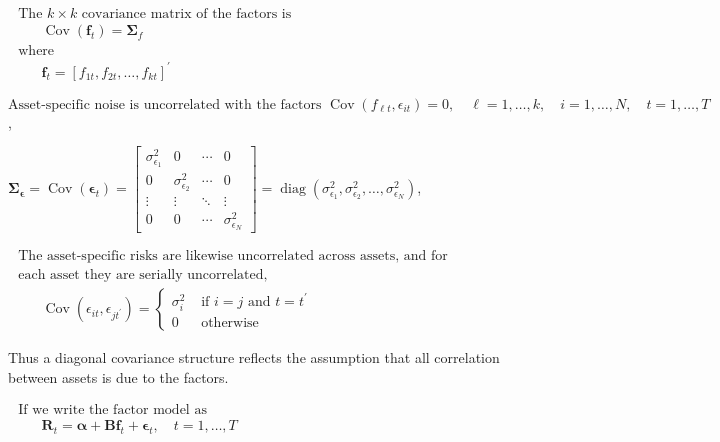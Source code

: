 \documentclass[11pt]{article}
\begin{document}
\(\begin{array}{l}{\text { The } k \times k \text { covariance matrix of the factors is }} \\ {\qquad \operatorname{Cov}\left(\boldsymbol{f}_{t}\right)=\boldsymbol{\Sigma}_{f}} \\ {\text { where }} \\ {\qquad \boldsymbol{f}_{t}=\left[f_{1 t}, f_{2 t}, \ldots, f_{k t}\right]^{\prime}}\end{array}\)

\(\text {Asset-specific noise is uncorrelated with the factors } \operatorname{Cov}\left(f_{\ell t}, \epsilon_{i t}\right)=0, \quad \ell=1, \ldots, k, \quad i=1, \ldots, N, \quad t=1, \ldots, T\),

\(\boldsymbol{\Sigma}_{\boldsymbol{\epsilon}}=\operatorname{Cov}\left(\boldsymbol{\epsilon}_{t}\right)=\left[\begin{array}{cccc}{\sigma_{\epsilon_{1}}^{2}} & {0} & {\cdots} & {0} \\ {0} & {\sigma_{\epsilon_{2}}^{2}} & {\cdots} & {0} \\ {\vdots} & {\vdots} & {\ddots} & {\vdots} \\ {0} & {0} & {\cdots} & {\sigma_{\epsilon_{N}}^{2}}\end{array}\right]=\operatorname{diag}\left(\sigma_{\epsilon_{1}}^{2}, \sigma_{\epsilon_{2}}^{2}, \ldots, \sigma_{\epsilon_{N}}^{2}\right)\),

\(\begin{array}{l}{\text { The asset-specific risks are likewise uncorrelated across assets, and for }} \\ {\text { each asset they are serially uncorrelated, }} \\ {\qquad \operatorname{Cov}\left(\epsilon_{i t}, \epsilon_{j t^{\prime}}\right)=\left\{\begin{array}{ll}{\sigma_{i}^{2}} & {\text { if } i=j \text { and } t=t^{\prime}} \\ {0} & {\text { otherwise }}\end{array}\right.}\end{array}\)

Thus a diagonal covariance structure reflects the assumption that all
correlation between assets is due to the factors.

\(\begin{array}{l}{\text { If we write the factor model as }} \\ {\qquad \boldsymbol{R}_{t}=\boldsymbol{\alpha}+\boldsymbol{B} \boldsymbol{f}_{t}+\boldsymbol{\epsilon}_{t}, \quad t=1, \ldots, T}\end{array}\)
\end{document}
